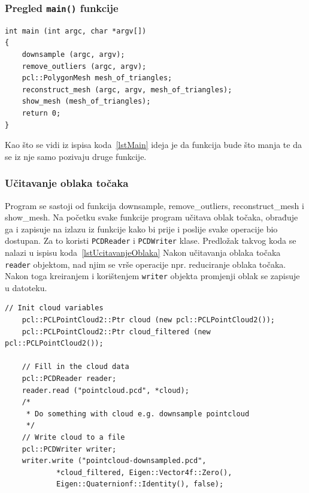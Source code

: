 \newpage
\subsubsection{Pregled \texttt{main()} funkcije} %
\label{ssub:Pregled main funkcije}
\begin{lstlisting}[label=lstMain,caption={Izvorni kod
\texttt{main()} funkcije }]
int main (int argc, char *argv[])
{
    downsample (argc, argv);
    remove_outliers (argc, argv);
    pcl::PolygonMesh mesh_of_triangles;
    reconstruct_mesh (argc, argv, mesh_of_triangles);
    show_mesh (mesh_of_triangles);
    return 0;
}
\end{lstlisting}
Kao što se vidi iz ispisa koda~\ref{lstMain} ideja je da funkcija bude
što manja te da se iz nje samo pozivaju druge funkcije. 


\subsubsection{Učitavanje oblaka točaka} %
\label{ssub:Učitavanje oblaka točaka}
Program se sastoji od funkcija downsample, remove\_outliers,
reconstruct\_mesh i show\_mesh. Na početku svake funkcije program
učitava oblak točaka, obrađuje ga i zapisuje na izlazu iz funkcije kako
bi prije i poslije svake operacije bio dostupan. Za to koristi
\texttt{PCDReader} i \texttt{PCDWriter} klase. Predložak takvog koda se
nalazi u ispisu koda~\ref{lstUcitavanjeOblaka} Nakon učitavanja oblaka
točaka \texttt{reader} objektom, nad njim se vrše operacije npr.
reduciranje oblaka točaka. Nakon toga kreiranjem i korištenjem
\texttt{writer} objekta promjenji oblak se zapisuje u datoteku.

\begin{lstlisting}[label=lstUcitavanjeOblaka, caption={Predložak izvornog
koda za učitavanje oblaka točaka}]
    // Init cloud variables 
    pcl::PCLPointCloud2::Ptr cloud (new pcl::PCLPointCloud2());
    pcl::PCLPointCloud2::Ptr cloud_filtered (new pcl::PCLPointCloud2());

    // Fill in the cloud data
    pcl::PCDReader reader;
    reader.read ("pointcloud.pcd", *cloud);
    /* 
     * Do something with cloud e.g. downsample pointcloud
     */
    // Write cloud to a file
    pcl::PCDWriter writer;
    writer.write ("pointcloud-downsampled.pcd",
            *cloud_filtered, Eigen::Vector4f::Zero(),
            Eigen::Quaternionf::Identity(), false);
\end{lstlisting}

